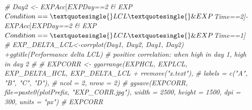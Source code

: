\documentclass[
]{article}
\newenvironment{Shaded}{\begin{snugshade}}{\end{snugshade}}
\newcommand{\CommentTok}[1]{\textcolor[rgb]{0.56,0.35,0.01}{\textit{#1}}}
\begin{document}
\begin{Shaded}
\begin{Highlighting}[]
\CommentTok{\#  Day2 \textless{}{-} EXP$Acc[EXP$Day==2 \& EXP$Condition==\textquotesingle{}LCL\textquotesingle{} \& EXP$Time==2]{-} EXP$Acc[EXP$Day==2 \& EXP$Condition==\textquotesingle{}LCL\textquotesingle{} \& EXP$Time==1]}
\CommentTok{\#  EXP\_DELTA\_LCL\textless{}{-}corrplot(Day1, Day2, \textquotesingle{}Day1\textquotesingle{}, \textquotesingle{}Day2\textquotesingle{}) +ggtitle(\textquotesingle{}Performance delta LCL\textquotesingle{}) \# positive correlation: when high in day 1, high in day 2}
\CommentTok{\# }
\CommentTok{\#  EXPCORR \textless{}{-} ggarrange(EXPHCL, EXPLCL, EXP\_DELTA\_HCL, EXP\_DELTA\_LCL + rremove("x.text"),}
\CommentTok{\#            labels = c("A", "B", "C", "D"),}
\CommentTok{\#            ncol = 2, nrow = 2)}
\CommentTok{\#  ggsave(EXPCORR, file=paste0(plotPrefix, "EXP\_CORR.jpg"), width = 2500, height = 1500, dpi = 300, units = "px")}
\CommentTok{\#  EXPCORR}


\end{Highlighting}
\end{Shaded}
\end{document}
